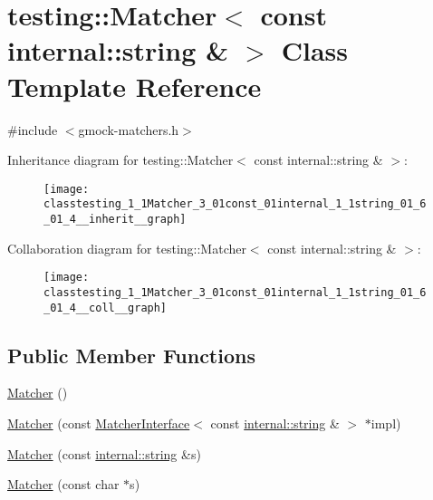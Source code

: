 \hypertarget{classtesting_1_1Matcher_3_01const_01internal_1_1string_01_6_01_4}{}\section{testing\+:\+:Matcher$<$ const internal\+:\+:string \& $>$ Class Template Reference}
\label{classtesting_1_1Matcher_3_01const_01internal_1_1string_01_6_01_4}


{\ttfamily \#include $<$gmock-\/matchers.\+h$>$}



Inheritance diagram for testing\+:\+:Matcher$<$ const internal\+:\+:string \& $>$\+:\nopagebreak
\begin{figure}[H]
\begin{center}
\leavevmode
\texttt{[image: classtesting\_1\_1Matcher\_3\_01const\_01internal\_1\_1string\_01\_6\_01\_4\_\_inherit\_\_graph]}
\end{center}
\end{figure}


Collaboration diagram for testing\+:\+:Matcher$<$ const internal\+:\+:string \& $>$\+:\nopagebreak
\begin{figure}[H]
\begin{center}
\leavevmode
\texttt{[image: classtesting\_1\_1Matcher\_3\_01const\_01internal\_1\_1string\_01\_6\_01\_4\_\_coll\_\_graph]}
\end{center}
\end{figure}
\subsection*{Public Member Functions}
\begin{DoxyCompactItemize}
\item 
\hyperlink{classtesting_1_1Matcher_3_01const_01internal_1_1string_01_6_01_4_a0385eac840bb8fd52c93c51c2687dd6f}{Matcher} ()
\item 
\hyperlink{classtesting_1_1Matcher_3_01const_01internal_1_1string_01_6_01_4_a45670b268a87239be6520c1b0fbe015e}{Matcher} (const \hyperlink{classtesting_1_1MatcherInterface}{Matcher\+Interface}$<$ const \hyperlink{namespacetesting_1_1internal_a8e8ff5b11e64078831112677156cb111}{internal\+::string} \& $>$ $\ast$impl)
\item 
\hyperlink{classtesting_1_1Matcher_3_01const_01internal_1_1string_01_6_01_4_a3414bb154dfc4d19818a0c7878d662f4}{Matcher} (const \hyperlink{namespacetesting_1_1internal_a8e8ff5b11e64078831112677156cb111}{internal\+::string} \&s)
\item 
\hyperlink{classtesting_1_1Matcher_3_01const_01internal_1_1string_01_6_01_4_a7a98217eaa834207c4e51bb6d5283ed6}{Matcher} (const char $\ast$s)
\end{DoxyCompactItemize}

